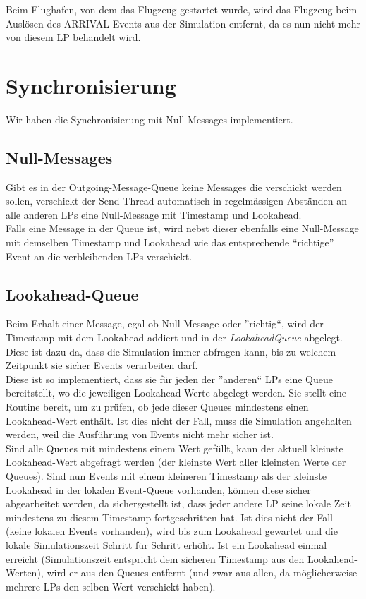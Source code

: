 \documentclass[oneside,DIV12,BCOR0.5cm,bibliography=totoc]{template}
\begin{document}
\begin{empfile}
Beim Flughafen, von dem das Flugzeug gestartet wurde, wird das Flugzeug
beim Auslösen des ARRIVAL-Events aus der Simulation entfernt, da es
nun nicht mehr von diesem LP behandelt wird.\\

\section{Synchronisierung}

Wir haben die Synchronisierung mit Null-Messages implementiert.

\subsection{Null-Messages}

Gibt es in der Outgoing-Message-Queue keine Messages die verschickt
werden sollen, verschickt der Send-Thread automatisch in regelmässigen
Abständen an alle anderen LPs eine Null-Message mit Timestamp und 
Lookahead.\\

Falls eine Message in der Queue ist, wird nebst dieser ebenfalls eine
Null-Message mit demselben Timestamp und Lookahead wie das entsprechende
``richtige'' Event an die verbleibenden LPs verschickt.

\subsection{Lookahead-Queue}

Beim Erhalt einer Message, egal ob Null-Message oder ''richtig``, wird
der Timestamp mit dem Lookahead addiert und in der \emph{LookaheadQueue}
abgelegt. Diese ist dazu da, dass die Simulation immer abfragen kann,
bis zu welchem Zeitpunkt sie sicher Events verarbeiten darf.\\

Diese ist so implementiert, dass sie für jeden der ''anderen`` LPs
eine Queue bereitstellt, wo die jeweiligen Lookahead-Werte abgelegt
werden. Sie stellt eine Routine bereit, um zu prüfen, ob jede dieser
Queues mindestens einen Lookahead-Wert enthält. Ist dies nicht der Fall,
muss die Simulation angehalten werden, weil die Ausführung von Events
nicht mehr sicher ist.\\

Sind alle Queues mit mindestens einem Wert gefüllt, kann der aktuell
kleinste Lookahead-Wert abgefragt werden (der kleinste Wert aller
kleinsten Werte der Queues). Sind nun Events mit einem kleineren
Timestamp als der kleinste Lookahead in der lokalen Event-Queue
vorhanden, können diese sicher abgearbeitet werden, da sichergestellt
ist, dass jeder andere LP seine lokale Zeit mindestens zu diesem
Timestamp fortgeschritten hat. Ist dies nicht der Fall (keine lokalen
Events vorhanden), wird bis zum Lookahead gewartet und die lokale
Simulationszeit Schritt für Schritt erhöht. Ist ein Lookahead einmal
erreicht (Simulationszeit entspricht dem sicheren Timestamp aus den
Lookahead-Werten), wird er aus den Queues entfernt (und zwar aus allen,
da möglicherweise mehrere LPs den selben Wert verschickt haben).


\end{empfile}
\end{document}
